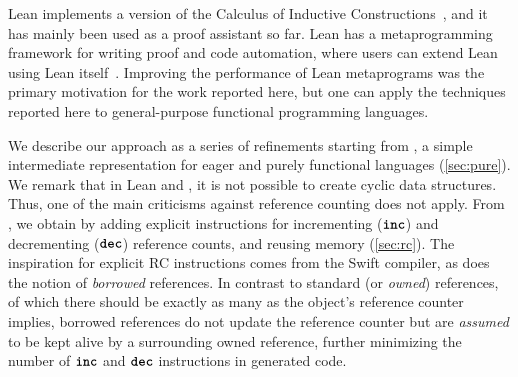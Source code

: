Lean implements a version of the Calculus of Inductive
Constructions~\cite{coquand:huet:88,coquand:paulin:mohring:90}, and it
has mainly been used as a proof assistant so far. Lean has a
metaprogramming framework for writing proof and code automation, where
users can extend Lean using Lean itself~\cite{ebner17meta}. Improving
the performance of Lean metaprograms was the primary motivation for the work
reported here, but one can apply the techniques reported here
to general-purpose functional programming languages.

We describe our approach as a series of refinements starting from
\pureIR{}, a simple intermediate representation for eager and purely
functional languages (\cref{sec:pure}). We remark that in Lean and
\pureIR{}, it is not possible to create cyclic data structures. Thus,
one of the main criticisms against reference counting does not
apply. From \pureIR{}, we obtain \rcIR{} by adding explicit instructions
for incrementing ($\texttt{\textbf{inc}}$) and decrementing ($\texttt{\textbf{dec}}$) reference
counts, and reusing memory (\cref{sec:rc}). The inspiration for explicit
RC instructions comes from the Swift compiler, as does the notion
of \emph{borrowed} references. In contrast to standard
(or \emph{owned}) references, of which there should be exactly as many
as the object's reference counter implies, borrowed references do not
update the reference counter but are \emph{assumed} to be kept alive
by a surrounding owned reference, further minimizing the number of
$\texttt{\textbf{inc}}$ and $\texttt{\textbf{dec}}$ instructions in generated code.

